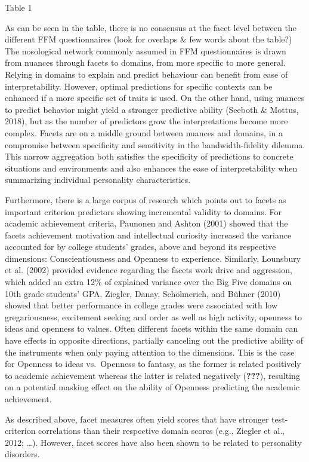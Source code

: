 \documentclass[man]{apa6}
\theoremstyle{definition}
\theoremstyle{definition}
\theoremstyle{definition}
\theoremstyle{remark}
\begin{document}
Table 1

As can be seen in the table, there is no consensus at the facet level
between the different FFM questionnaires (look for overlaps \& few words
about the table?) The nosological network commonly assumed in FFM
questionnaires is drawn from nuances through facets to domains, from
more specific to more general. Relying in domains to explain and predict
behaviour can benefit from ease of interpretability. However, optimal
predictions for specific contexts can be enhanced if a more specific set
of traits is used. On the other hand, using nuances to predict behavior
might yield a stronger predictive ability (Seeboth \& Mottus, 2018), but
as the number of predictors grow the interpretations become more
complex. Facets are on a middle ground between nuances and domains, in a
compromise between specificity and sensitivity in the bandwidth-fidelity
dilemma. This narrow aggregation both satisfies the specificity of
predictions to concrete situations and environments and also enhances
the ease of interpretability when summarizing individual personality
characteristics.

Furthermore, there is a large corpus of research which points out to
facets as important criterion predictors showing incremental validity to
domains. For academic achievement criteria, Paunonen and Ashton (2001)
showed that the facets achievement motivation and intellectual curiosity
increased the variance accounted for by college students' grades, above
and beyond its respective dimensions: Conscientiousness and Openness to
experience. Similarly, Lounsbury et al. (2002) provided evidence
regarding the facets work drive and aggression, which added an extra
12\% of explained variance over the Big Five domains on 10th grade
students' GPA. Ziegler, Danay, Schölmerich, and Bühner (2010) showed
that better performance in college grades were associated with low
gregariousness, excitement seeking and order as well as high activity,
openness to ideas and openness to values. Often different facets within
the same domain can have effects in opposite directions, partially
canceling out the predictive ability of the instruments when only paying
attention to the dimensions. This is the case for Openness to ideas
vs.~Openness to fantasy, as the former is related positively to academic
achievement whereas the latter is related negatively ({\textbf{???}}),
resulting on a potential masking effect on the ability of Openness
predicting the academic achievement.

As described above, facet measures often yield scores that have stronger
test-criterion correlations than their respective domain scores (e.g.,
Ziegler et al., 2012; \ldots{}). However, facet scores have also been
shown to be related to personality disorders.
\end{document}
